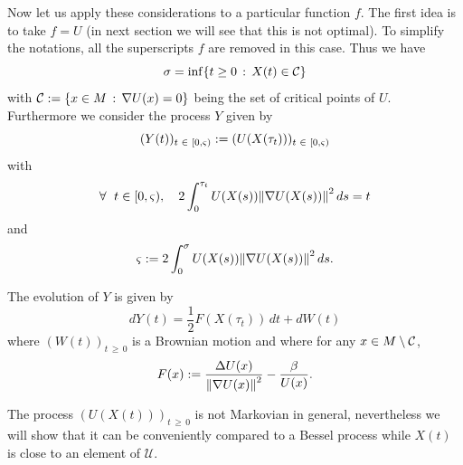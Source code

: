 \documentclass[10pt]{amsart}
\theoremstyle{definition}\newtheorem{defi}[theo]{Definition}\newtheorem{rema}[theo]{Remark}\newtheorem{exam}[theo]{Example}\newtheorem{exem}[theo]{Example}\newtheorem{nota}[theo]{Notation}
\newcommand{\f}[2]{\frac{#1}{#2}}
\newcommand{\cC}{\mathcal{C}}
\newcommand{\cU}{\mathcal{U}}
\newcommand{\na}{\nabla}
\newcommand{\tr}{\Delta}
\newcommand{\fo}{\forall\ }
\let\originalleft\left
\let\originalright\right
\renewcommand{\left}{\mathopen{}\mathclose\bgroup\originalleft}
\renewcommand{\right}{\aftergroup\egroup\originalright}
\let\oldin\in
\renewcommand{\in}{\mathchoice{\oldin}{\oldin}{\,\oldin\,}{\,\oldin\,}}
\let\oldforall\forall
\renewcommand*{\forall}{\mathrel{\oldforall}}
\begin{document}
Now let us apply these considerations to a particular function $f$. The first idea is to take $f=U$ (in next section we will see that this is not optimal). To simplify the notations, all the superscripts $f$ are removed in this case. Thus we have
\begin{equation*}
\sigma = \inf\{t\geq 0\,:\, X(t)\in\cC\}
\end{equation*}
with $\cC:=\{x\in M\,:\, \na U(x)=0\}$ being the set of critical points of $U$. Furthermore we consider the process $Y$ given by
\begin{equation*}
(Y(t))_{t\in [0,\varsigma)} := (U(X(\tau_t)))_{t\in [0,\varsigma)}
\end{equation*}
with
\begin{equation*}
\fo t\in[0,\varsigma),\quad 2\int_0^{\tau_t} U(X(s))\left\| \na U(X(s))\right\|^2\, ds = t
\end{equation*}
and
\begin{equation*}
\varsigma := 2\int_0^{\sigma} U(X(s))\left\| \na U(X(s))\right\|^2\, ds.
\end{equation*}


The evolution of $Y$ is given by
\begin{equation}\label{Y}
dY(t) =
\f12F(X(\tau_t)) \, dt +dW(t)
\end{equation}
where $(W(t))_{t\,\geq\,0}$ is a Brownian motion and where for any $x\in M\setminus\cC$,
\begin{equation*}
F(x) := 
\f{\tr U(x)}{\left\| \na U(x)\right\|^2}-\f{\beta}{U(x)}.
\end{equation*}

The process $({U}(X(t)))_{t\,\geq\,0}$ is not Markovian in general, nevertheless we will show that it can be conveniently compared to a Bessel process while $X(t)$ is close to an element of $\cU$.
\end{document}
